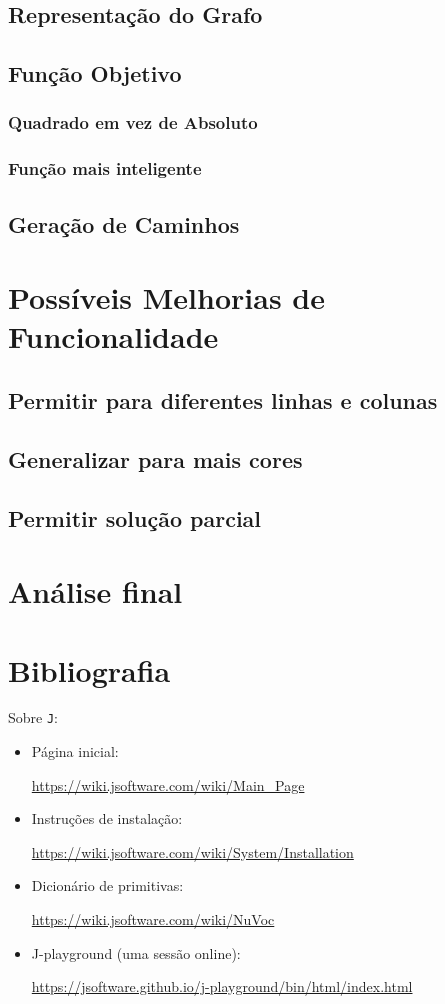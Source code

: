 \documentclass{article}
\newcommand{\lang}{\texttt{J}}
\begin{document}
\subsection{Representação do Grafo}

\subsection{Função Objetivo}
\subsubsection{Quadrado em vez de Absoluto}
\subsubsection{Função mais inteligente}

\subsection{Geração de Caminhos}

\section{Possíveis Melhorias de Funcionalidade}
\subsection{Permitir para diferentes linhas e colunas}
\subsection{Generalizar para mais cores}
\subsection{Permitir solução parcial}

\section{Análise final}

\section{Bibliografia} \label{s:bib}

Sobre \lang{}:
\begin{itemize}
    \item Página inicial: \par
        \url{https://wiki.jsoftware.com/wiki/Main_Page}
    \item Instruções de instalação: \par
        \url{https://wiki.jsoftware.com/wiki/System/Installation}
    \item Dicionário de primitivas: \par
        \url{https://wiki.jsoftware.com/wiki/NuVoc}
    \item J-playground (uma sessão online): \par
        \url{https://jsoftware.github.io/j-playground/bin/html/index.html}
\end{itemize}
\end{document}
